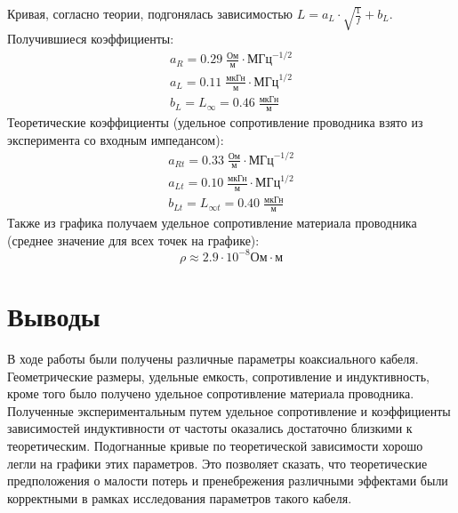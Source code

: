 \documentclass[a4paper,14pt]{extarticle}
\begin{document}
		Кривая, согласно теории, подгонялась зависимостью $L = a_L \cdot \sqrt{\frac{1}{f}} +  b_L$.
		Получившиеся коэффициенты:
		\begin{equation}
			\begin{gathered}
				a_R = 0.29 \; \frac{\text{Ом}}{\text{м}} \cdot \text{МГц}^{-1/2}\\
				a_L = 0.11 \; \frac{\text{мкГн}}{\text{м}} \cdot \text{МГц}^{1/2}\\
				b_L = L_\infty =  0.46 \; \frac{\text{мкГн}}{\text{м}}
			\end{gathered}
		\end{equation}
		Теоретические коэффициенты (удельное сопротивление проводника взято из эксперимента со входным импедансом):
		\begin{equation}
			\begin{gathered}
				a_{Rt} = 0.33 \; \frac{\text{Ом}}{\text{м}} \cdot \text{МГц}^{-1/2}\\
				a_{Lt} = 0.10 \; \frac{\text{мкГн}}{\text{м}} \cdot \text{МГц}^{1/2}\\
				b_{Lt} = L_{\infty t} =  0.40 \; \frac{\text{мкГн}}{\text{м}}
			\end{gathered}
		\end{equation}
		Также из графика получаем удельное сопротивление материала проводника (среднее значение для всех точек на графике):
		\begin{equation}
			\rho \approx 2.9 \cdot 10^{-8} \text{Ом} \cdot \text{м}
		\end{equation}
		\section{Выводы}
		В ходе работы были получены различные параметры коаксиального кабеля. Геометрические размеры, удельные емкость, сопротивление и индуктивность, кроме того было получено удельное сопротивление материала проводника. Полученные экспериментальным путем удельное сопротивление и коэффициенты зависимостей индуктивности от частоты оказались достаточно близкими к теоретическим. Подогнанные кривые по теоретической зависимости хорошо легли на графики этих параметров. Это позволяет сказать, что теоретические предположения о малости потерь и пренебрежения различными эффектами были корректными в рамках исследования параметров такого кабеля.
\end{document}
